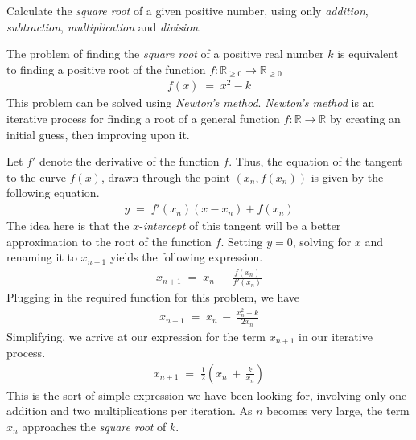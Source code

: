 

\problem Calculate the \textit{square root} of a given positive number, using only \textit{addition}, \textit{subtraction}, \textit{multiplication}
and \textit{division}.

\solution
The problem of finding the \textit{square root} of a positive real number $k$ is equivalent to finding a positive root of the function 
$f : \mathbb{R}_{\ge 0} \to \mathbb{R}_{\ge 0} $
\begin{align*}
	f(x) \;=\; x^2 - k
\end{align*}
This problem can be solved using \textit{Newton's method}. \textit{Newton's method} is an iterative process for finding a root of a general function
$f : \mathbb{R} \to \mathbb{R}$ by creating an initial guess, then improving upon it. 
\par
Let $f'$ denote the derivative of the function $f$. Thus, the equation of the tangent to the curve $f(x)$, drawn through the
point $(x_n, f(x_n))$ is given by the following equation.
\begin{align*}
	y \;=\; f'(x_n)(x - x_n) + f(x_n)
\end{align*}
The idea here is that the $x$-\textit{intercept} of this tangent will be a better approximation to the root of the function $f$. Setting
$y = 0$, solving for $x$ and renaming it to $x_{n+1}$ yields the following expression.
\begin{align*}
	x_{n+1} \;=\; x_n \,-\, \frac{f(x_n)}{f'(x_n)}
\end{align*}
Plugging in the required function for this problem, we have
\begin{align*}
	x_{n+1} \;=\; x_n \,-\, \frac{x_n^2 - k}{2x_n}
\end{align*}
Simplifying, we arrive at our expression for the term $x_{n+1}$ in our iterative process.
\begin{align*}
	x_{n+1} \;=\; \frac{1}{2} \left( x_n \,+\, \frac{k}{x_n} \right)
\end{align*}
This is the sort of simple expression we have been looking for, involving only one addition and two multiplications per iteration.
As $n$ becomes very large, the term $x_n$ approaches the \textit{square root} of $k$.
